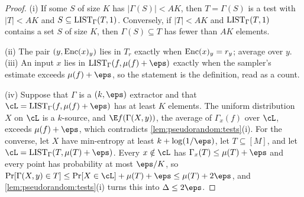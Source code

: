 \begin{refsection}
\begin{proof}
(i) If some $S$ of size $K$ has $|\Gamma(S)|<AK$, then $T=\Gamma(S)$ is a test with $|T|<AK$ and $S\subseteq\mathrm{LIST}_\Gamma(T,1)$. Conversely, if $|T|<AK$ and $\mathrm{LIST}_\Gamma(T,1)$ contains a set $S$ of size $K$, then $\Gamma(S)\subseteq T$ has fewer than $AK$ elements.

(ii) The pair $(y,\operatorname{Enc}(x)_y)$ lies in $T_r$ exactly when $\operatorname{Enc}(x)_y=r_y$; average over $y$. (iii) An input $x$ lies in $\pseudorandomList_\Gamma(f,\mu(f)+\eps)$ exactly when the sampler's estimate exceeds $\mu(f)+\eps$, so the statement is the definition, read as a count.

(iv) Suppose that $\Gamma$ is a $(k,\eps)$ extractor and that $\cL=\pseudorandomList_\Gamma(f,\mu(f)+\eps)$ has at least $K$ elements. The uniform distribution $X$ on $\cL$ is a $k$-source, and $\E f(\Gamma(X,y))$, the average of $\Gamma_x(f)$ over $\cL$, exceeds $\mu(f)+\eps$, which contradicts \cref{lem:pseudorandom:tests}(i). For the converse, let $X$ have min-entropy at least $k+\log(1/\eps)$, let $T\subseteq[M]$, and let $\cL=\pseudorandomList_\Gamma(T,\mu(T)+\eps)$. Every $x\notin\cL$ has $\Gamma_x(T)\le\mu(T)+\eps$ and every point has probability at most $\eps/K$, so $\Pr[\Gamma(X,y)\in T]\le\Pr[X\in\cL]+\mu(T)+\eps\le\mu(T)+2\eps$, and \cref{lem:pseudorandom:tests}(i) turns this into $\Delta\le2\eps$.
\end{proof}


\end{refsection}

